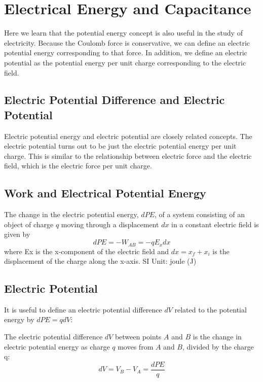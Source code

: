 \section{Electrical Energy and Capacitance}
Here we learn that the potential energy concept is also useful in the study of electricity. Because the Coulomb force is conservative, we can define an electric potential energy corresponding to that force. In addition, we define an electric potential as the potential energy per unit charge corresponding to the electric field.

\subsection{Electric Potential Difference and Electric Potential}
Electric potential energy and electric potential are closely related concepts. The electric potential turns out to be just the electric potential energy per unit charge. This is similar to the relationship between electric force and the electric field,
which is the electric force per unit charge.

\subsection{Work and Electrical Potential Energy}
\begin{form}
The change in the electric potential energy, $d PE$, of a system consisting of an object of charge $q$ moving through a displacement $d x$ in a constant electric field is given by
$$d PE = -W_{AB} = - qE_xd x$$
where Ex is the x-component of the electric field and $d x= x_f + x_i$ is the displacement of the charge along the x-axis.
SI Unit: joule (J)
\end{form}

\subsection{Electric Potential}
It is useful to define an electric potential difference $d V$ related to the potential energy by $d PE = qd V$:
\begin{form}
The electric potential difference $d V$ between points $A$ and $B$ is the change in electric potential energy as charge $q$ moves from $A$ and $B$, divided by the charge q:
$$d V = V_B - V_A = \frac{d PE}{q}$$
\end{form}